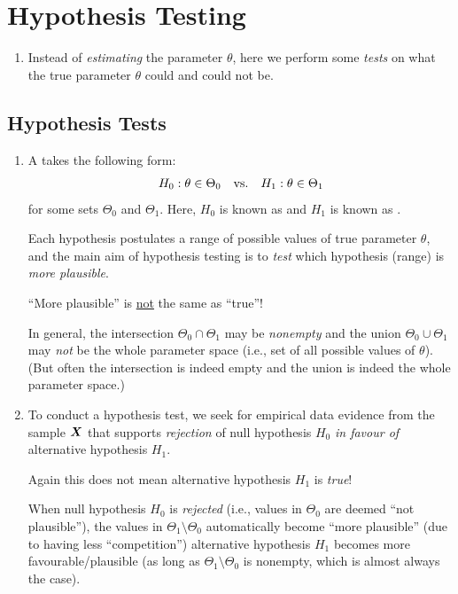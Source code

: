 \section{Hypothesis Testing}
\label{sect:hypothesis-testing}
\begin{enumerate}
\item Instead of \emph{estimating} the parameter \(\theta\), here we perform
some \emph{tests} on what the true parameter \(\theta\) could and could not
be.
\end{enumerate}
\subsection{Hypothesis Tests}
\begin{enumerate}
\item A  takes the following form:
\[
H_0: \theta\in\Theta_0\qqtext{vs.}H_1:\theta\in\Theta_1
\]
for some sets \(\Theta_0\) and \(\Theta_1\). Here, \(H_0\) is known as
 and \(H_1\) is known as .

Each hypothesis postulates a range of possible values of true parameter
\(\theta\), and the main aim of hypothesis testing is to \emph{test} which
hypothesis (range) is \emph{more plausible}. \begin{warning}
``More plausible'' is \underline{not} the same as ``true''!
\end{warning}

\begin{note}
In general, the intersection \(\Theta_0\cap\Theta_1\) may be \emph{nonempty}
and the union \(\Theta_0\cup\Theta_1\) may \emph{not} be the whole parameter
space (i.e., set of all possible values of \(\theta\)). (But often the
intersection is indeed empty and the union is indeed the whole parameter
space.)
\end{note}
\item To conduct a hypothesis test, we seek for empirical data evidence from
the sample \(\vb*{X}\) that supports {\color{red}\emph{rejection}} of null
hypothesis \(H_0\) {\color{ForestGreen}\emph{in favour of}} alternative
hypothesis \(H_1\). \begin{warning}
Again this does not mean alternative hypothesis \(H_1\) is \emph{true}!
\end{warning}

\begin{note}
When null hypothesis \(H_0\) is \emph{rejected} (i.e., values in \(\Theta_0\)
are deemed ``not plausible''), the values in \(\Theta_1\setminus\Theta_0\)
automatically become ``more plausible'' (due to having less ``competition'')
 alternative hypothesis \(H_1\) becomes more
favourable/plausible (as long as \(\Theta_1\setminus\Theta_0\) is nonempty,
which is almost always the case).
\end{note}


\end{enumerate}
